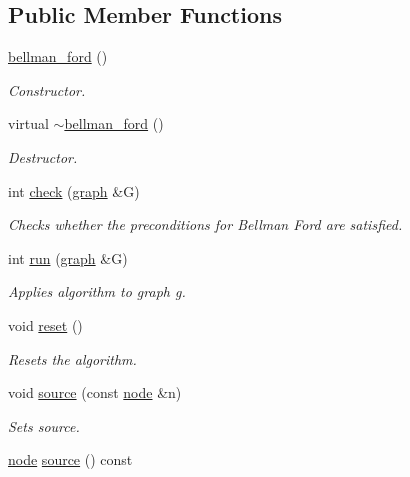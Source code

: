 \subsection*{Public Member Functions}
\begin{DoxyCompactItemize}
\item 
\mbox{\hyperlink{classbellman__ford_a0bc366d9bbdecf3748b7eeee80690386}{bellman\+\_\+ford}} ()
\begin{DoxyCompactList}\small\item\em Constructor. \end{DoxyCompactList}\item 
virtual \mbox{\hyperlink{classbellman__ford_a8461c6b8d7663b05a97b6d270347a49c}{$\sim$bellman\+\_\+ford}} ()
\begin{DoxyCompactList}\small\item\em Destructor. \end{DoxyCompactList}\item 
int \mbox{\hyperlink{classbellman__ford_a9da2fb7d20ef1f726ee935474302d80b}{check}} (\mbox{\hyperlink{classgraph}{graph}} \&G)
\begin{DoxyCompactList}\small\item\em Checks whether the preconditions for Bellman Ford are satisfied. \end{DoxyCompactList}\item 
int \mbox{\hyperlink{classbellman__ford_a226308389f3c36dfc02768c09f777a3b}{run}} (\mbox{\hyperlink{classgraph}{graph}} \&G)
\begin{DoxyCompactList}\small\item\em Applies algorithm to graph g. \end{DoxyCompactList}\item 
void \mbox{\hyperlink{classbellman__ford_a7d28afa62ce8068c4d0f2d1f96136fd6}{reset}} ()
\begin{DoxyCompactList}\small\item\em Resets the algorithm. \end{DoxyCompactList}\item 
void \mbox{\hyperlink{classbellman__ford_a98cad540fd2d211c1ba44bb6fa8416f3}{source}} (const \mbox{\hyperlink{classnode}{node}} \&n)
\begin{DoxyCompactList}\small\item\em Sets source. \end{DoxyCompactList}\item 
\mbox{\hyperlink{classnode}{node}} \mbox{\hyperlink{classbellman__ford_a86e3fe7fe71d7569cc73e9e531d58539}{source}} () const

\end{DoxyCompactItemize}

